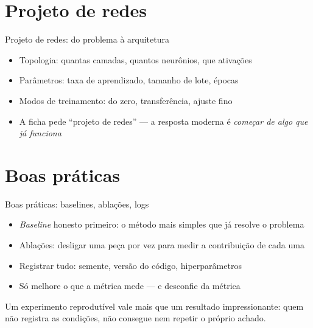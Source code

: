 \documentclass[aspectratio=169, 11pt]{beamer}
\begin{document}
\section{Projeto de redes}

\begin{frame}{Projeto de redes: do problema à arquitetura}
  \begin{itemize}\setlength{\itemsep}{0.4ex}
    \item Topologia: quantas camadas, quantos neurônios, que ativações
    \item Parâmetros: taxa de aprendizado, tamanho de lote, épocas
    \item Modos de treinamento: do zero, transferência, ajuste fino
    \item A ficha pede ``projeto de redes'' — a resposta moderna é
          \emph{começar de algo que já funciona}
  \end{itemize}
\end{frame}

\section{Boas práticas}

\begin{frame}{Boas práticas: baselines, ablações, logs}
  \begin{itemize}\setlength{\itemsep}{0.4ex}
    \item \emph{Baseline} honesto primeiro: o método mais simples que já
          resolve o problema
    \item Ablações: desligar uma peça por vez para medir a contribuição de
          cada uma
    \item Registrar tudo: semente, versão do código, hiperparâmetros
    \item Só melhore o que a métrica mede — e desconfie da métrica
  \end{itemize}
  \begin{ideiabox}
    Um experimento reprodutível vale mais que um resultado impressionante:
    quem não registra as condições, não consegue nem repetir o próprio
    achado.
  \end{ideiabox}
\end{frame}
\end{document}
